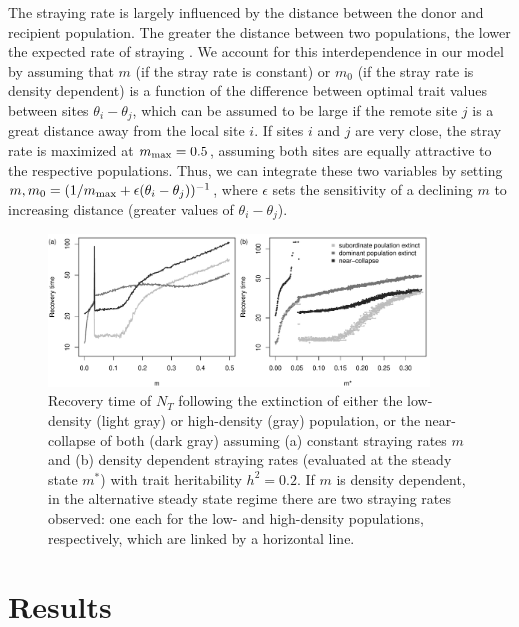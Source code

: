 \documentclass[twocolumn,preprintnumbers,amsmath,amssymb,superscriptaddress]{revtex4}
\begin{document}
The straying rate is largely influenced by the distance between the donor and recipient population.
The greater the distance between two populations, the lower the expected rate of straying \cite{H:2013fs,Westley:2015to}.
We account for this interdependence in our model by assuming that $m$ (if the stray rate is constant) or $m_0$ (if the stray rate is density dependent) is a function of the difference between optimal trait values between sites $\theta_i-\theta_j$, which can be assumed to be large if the remote site $j$ is a great distance away from the local site $i$.
If sites $i$ and $j$ are very close, the stray rate is maximized at $m_{\rm max} = 0.5$, assuming both sites are equally attractive to the respective populations.
Thus, we can integrate these two variables by setting $m,m_0 = (1/m_{\rm max} + \epsilon (\theta_i-\theta_j))^{-1}$, where $\epsilon$ sets the sensitivity of a declining $m$ to increasing distance (greater values of $\theta_i-\theta_j$).

\begin{figure}
  \captionsetup{justification=raggedright,
singlelinecheck=false
}
\centering
\includegraphics[width=0.9\textwidth]{figs2/fig_relax_lowh.pdf}
\caption{
Recovery time of $N_T$ following the extinction of either the low-density (light gray) or high-density (gray) population, or the near-collapse of both (dark gray) assuming (a) constant straying rates $m$ and (b) density dependent straying rates (evaluated at the steady state $m^*$) with trait heritability $h^2=0.2$.
If $m$ is density dependent, in the alternative steady state regime there are two straying rates observed: one each for the low- and high-density populations, respectively, which are linked by a horizontal line.
} \label{fig:relax}
\end{figure}



\section{Results}
\end{document}
